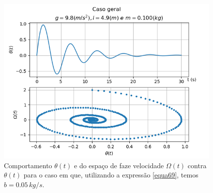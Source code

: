 \documentclass[12pt,openright,twoside,english,brazil]{abntex2}
\begin{document}


\begin{figure}[t]
 \centering
 \includegraphics[width=1.0\linewidth]{caso-geral-2.png}
 \caption{Comportamento $\theta(t)$ e do espaço de faze velocidade $\Omega(t)$ contra $\theta(t)$ para o caso em que, utilizando a expressão \ref{equa69}, temos $b=0.05\, kg/s$.}
\label{Figura15}
\end{figure}

\postextual

\end{document}
